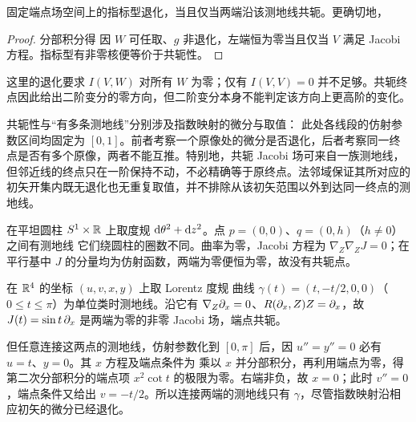 \begin{theorem}
    固定端点场空间上的指标型退化，当且仅当两端沿该测地线共轭。更确切地，
\end{theorem}
\begin{proof}
    分部积分得
    因 $W$ 可任取、$g$ 非退化，左端恒为零当且仅当 $V$ 满足 Jacobi 方程。指标型有非零核便等价于共轭性。
\end{proof}

这里的退化要求 $I(V,W)$ 对所有 $W$ 为零；仅有 $I(V,V)=0$ 并不足够。共轭终点因此给出二阶变分的零方向，但二阶变分本身不能判定该方向上更高阶的变化。

共轭性与“有多条测地线”分别涉及指数映射的微分与取值：
此处各线段的仿射参数区间均固定为 $[0,1]$。前者考察一个原像处的微分是否退化，后者考察同一终点是否有多个原像，两者不能互推。特别地，共轭 Jacobi 场可来自一族测地线，但邻近线的终点只在一阶保持不动，不必精确等于原终点。法邻域保证其所对应的初矢开集内既无退化也无重复取值，并不排除从该初矢范围以外到达同一终点的测地线。

\begin{example}[多条测地线而无共轭点]
    在平坦圆柱 $S^1\times\mathbb{R}$ 上取度规 $\dd\theta^2+\dd z^2$。点 $p=(0,0)$、$q=(0,h)$（$h\ne0$）之间有测地线
    它们绕圆柱的圈数不同。曲率为零，Jacobi 方程为 $\nabla_Z\nabla_ZJ=0$；在平行基中 $J$ 的分量均为仿射函数，两端为零便恒为零，故没有共轭点。
\end{example}

\begin{example}[共轭而连接测地线唯一]
    在 $\mathbb{R}^4$ 的坐标 $(u,v,x,y)$ 上取 Lorentz 度规
    曲线 $\gamma(t)=(t,-t/2,0,0)$（$0\leqslant t\leqslant\pi$）为单位类时测地线。沿它有 $\nabla_Z\partial_x=0$、$R(\partial_x,Z)Z=\partial_x$，故 $J(t)=\sin t\,\partial_x$ 是两端为零的非零 Jacobi 场，端点共轭。

    但任意连接这两点的测地线，仿射参数化到 $[0,\pi]$ 后，因 $u''=y''=0$ 必有 $u=t$、$y=0$。其 $x$ 方程及端点条件为
    乘以 $x$ 并分部积分，再利用端点为零，得
    第二次分部积分的端点项 $x^2\cot t$ 的极限为零。右端非负，故 $x=0$；此时 $v''=0$，端点条件又给出 $v=-t/2$。所以连接两端的测地线只有 $\gamma$，尽管指数映射沿相应初矢的微分已经退化。
\end{example}

